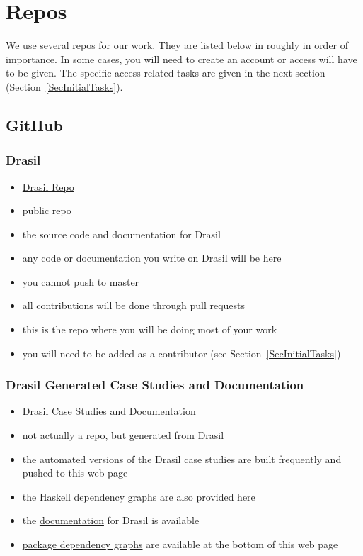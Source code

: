 \documentclass[12pt]{article}
\begin{document}
\section {Repos} \label{SecRepos}

We use several repos for our work.  They are listed below in roughly in order of
importance.  In some cases, you will need to create an account or access will
have to be given.  The specific access-related tasks are given in the next
section (Section~\ref{SecInitialTasks}).

\subsection{GitHub}

\subsubsection{Drasil}
\begin{itemize}
\item \href{https://github.com/JacquesCarette/Drasil} {Drasil Repo}
\item public repo
\item the source code and documentation for Drasil
\item any code or documentation you write on Drasil will be here
\item you cannot push to master
\item all contributions will be done through pull requests
\item this is the repo where you will be doing most of your work
\item you will need to be added as a contributor (see Section~\ref{SecInitialTasks})
\end{itemize}

\subsubsection{Drasil Generated Case Studies and Documentation}
\begin{itemize}
\item \href{https://jacquescarette.github.io/Drasil/} {Drasil Case Studies and Documentation}
\item not actually a repo, but generated from Drasil
\item the automated versions of the Drasil case studies are built frequently and
pushed to this web-page
\item the Haskell dependency graphs are also provided here
\item the \href{https://jacquescarette.github.io/Drasil/docs/index.html}
{documentation} for Drasil is available
\item \href{https://jacquescarette.github.io/Drasil/} {package dependency
graphs} are available at the bottom of this web page
\end{itemize}
\end{document}
